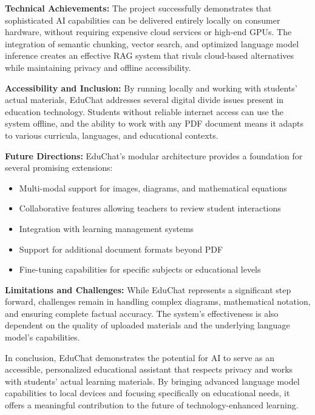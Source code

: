 \documentclass[12pt]{article}
\begin{document}
\textbf{Technical Achievements:} The project successfully demonstrates that sophisticated AI capabilities can be delivered entirely locally on consumer hardware, without requiring expensive cloud services or high-end GPUs. The integration of semantic chunking, vector search, and optimized language model inference creates an effective RAG system that rivals cloud-based alternatives while maintaining privacy and offline accessibility.

\textbf{Accessibility and Inclusion:} By running locally and working with students' actual materials, EduChat addresses several digital divide issues present in education technology. Students without reliable internet access can use the system offline, and the ability to work with any PDF document means it adapts to various curricula, languages, and educational contexts.

\textbf{Future Directions:} EduChat's modular architecture provides a foundation for several promising extensions:
\begin{itemize}[leftmargin=2em]
    \item Multi-modal support for images, diagrams, and mathematical equations
    \item Collaborative features allowing teachers to review student interactions
    \item Integration with learning management systems
    \item Support for additional document formats beyond PDF
    \item Fine-tuning capabilities for specific subjects or educational levels
\end{itemize}

\textbf{Limitations and Challenges:} While EduChat represents a significant step forward, challenges remain in handling complex diagrams, mathematical notation, and ensuring complete factual accuracy. The system's effectiveness is also dependent on the quality of uploaded materials and the underlying language model's capabilities.

In conclusion, EduChat demonstrates the potential for AI to serve as an accessible, personalized educational assistant that respects privacy and works with students' actual learning materials. By bringing advanced language model capabilities to local devices and focusing specifically on educational needs, it offers a meaningful contribution to the future of technology-enhanced learning.
\end{document}
